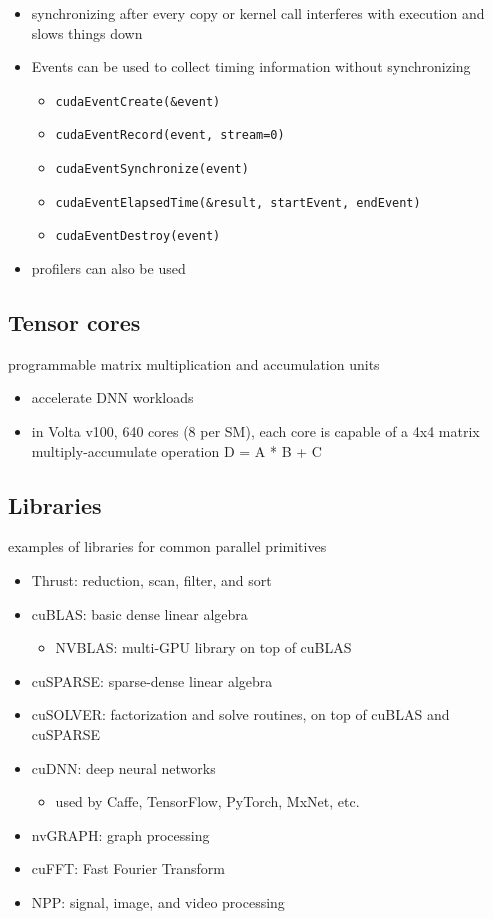 \documentclass{article}
\begin{document}
\begin{itemize}
\item synchronizing after every copy or kernel call interferes with execution and slows things down
\item Events can be used to collect timing information without synchronizing
\begin{itemize}
\item \texttt{cudaEventCreate(\&event)}
\item \texttt{cudaEventRecord(event, stream=0)}
\item \texttt{cudaEventSynchronize(event)}
\item \texttt{cudaEventElapsedTime(\&result, startEvent, endEvent)}
\item \texttt{cudaEventDestroy(event)}
\end{itemize}
\item profilers can also be used

\end{itemize}
\subsection{Tensor cores}

programmable matrix multiplication and accumulation units

\begin{itemize}
\item accelerate DNN workloads
\item in Volta v100, 640 cores (8 per SM), each core is capable of a 4x4 matrix multiply-accumulate operation D = A * B + C

\end{itemize}
\subsection{Libraries}

examples of libraries for common parallel primitives

\begin{itemize}
\item Thrust: reduction, scan, filter, and sort
\item cuBLAS: basic dense linear algebra
\begin{itemize}
\item NVBLAS: multi-GPU library on top of cuBLAS
\end{itemize}
\item cuSPARSE: sparse-dense linear algebra
\item cuSOLVER: factorization and solve routines, on top of cuBLAS and cuSPARSE
\item cuDNN: deep neural networks
\begin{itemize}
\item used by Caffe, TensorFlow, PyTorch, MxNet, etc.
\end{itemize}
\item nvGRAPH: graph processing
\item cuFFT: Fast Fourier Transform
\item NPP: signal, image, and video processing

\end{itemize}
\end{document}

